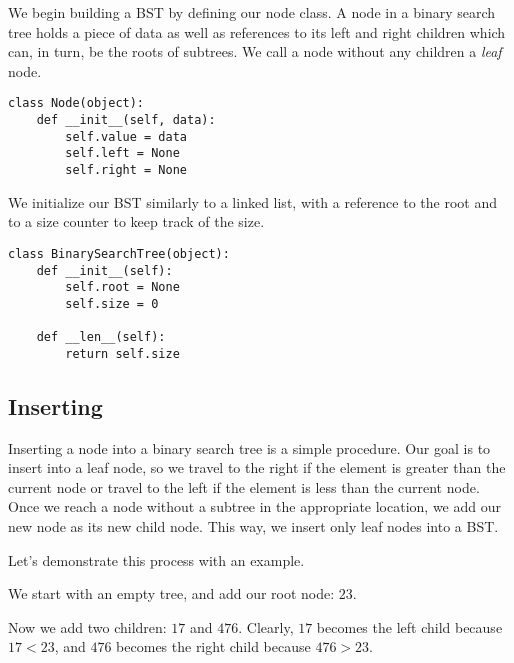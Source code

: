 We begin building a BST by defining our node class. 
A node in a binary search tree holds a piece of data as well as references to its left and right children which can, in turn, be the roots of subtrees.
We call a node without any children a \emph{leaf} node.
\begin{lstlisting}
class Node(object):
    def __init__(self, data):
        self.value = data
        self.left = None
        self.right = None
\end{lstlisting}
We initialize our BST similarly to a linked list, with a reference to the root and to a size counter to keep track of the size.
\begin{lstlisting}
class BinarySearchTree(object):
    def __init__(self):
        self.root = None
        self.size = 0
        
    def __len__(self):
        return self.size
\end{lstlisting}

\subsection*{Inserting}
Inserting a node into a binary search tree is a simple procedure.
Our goal is to insert into a leaf node, so we travel to the right if the element is greater than the current node or travel to the left if the element is less than the current node.
Once we reach a node without a subtree in the appropriate location, we add our new node as its new child node.
This way, we insert only leaf nodes into a BST.

Let's demonstrate this process with an example.

\begin{minipage}{0.35\textwidth}
\end{minipage}\hfill
\begin{minipage}{0.55\textwidth}
    We start with an empty tree, and add our root node: $23$.
\end{minipage}

\begin{minipage}{0.35\textwidth}
\end{minipage}\hfill
\begin{minipage}{0.55\textwidth}
    Now we add two children: $17$ and $476$.
    Clearly, $17$ becomes the left child because $17 < 23$, and $476$ becomes the right child because $476 > 23$.
\end{minipage}

